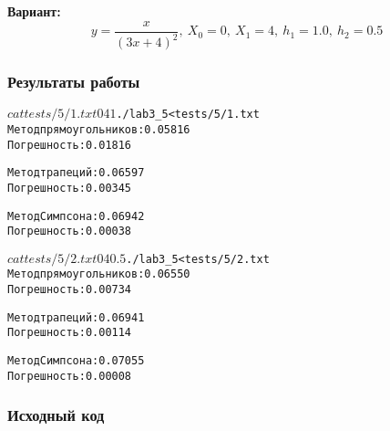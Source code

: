 {\bfseries Вариант:}
$$y = \frac{x}{(3x+4)^2},\ X_0 = 0,\ X_1 = 4,\ h_1 = 1.0,\ h_2 = 0.5$$

\subsubsection{Результаты работы}
\begin{alltt}
$ cat tests/5/1.txt
0 4 1

$ ./lab3_5 < tests/5/1.txt
Метод прямоугольников: 0.05816
Погрешность: 0.01816

Метод трапеций: 0.06597
Погрешность: 0.00345

Метод Симпсона: 0.06942
Погрешность: 0.00038

$ cat tests/5/2.txt
0 4 0.5

$ ./lab3_5 < tests/5/2.txt
Метод прямоугольников: 0.06550
Погрешность: 0.00734

Метод трапеций: 0.06941
Погрешность: 0.00114

Метод Симпсона: 0.07055
Погрешность: 0.00008

\end{alltt}
\pagebreak

\subsubsection{Исходный код}

\pagebreak